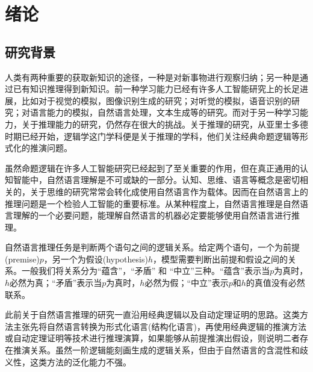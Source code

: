 \documentclass[UTF8,11pt,a4paper,nofonts]{ctexart}
\begin{document}
\newpage
\thispagestyle{empty}
\newpage
\tableofcontents
\thispagestyle{empty}

\newpage



\section{绪论}

\subsection{研究背景}
\par


人类有两种重要的获取新知识的途径，一种是对新事物进行观察归纳；另一种是通过已有知识推理得到新知识。前一种学习能力已经有许多人工智能研究上的长足进展，比如对于视觉的模拟，图像识别生成的研究\cite{}；对听觉的模拟，语音识别的研究\cite{}；对语言能力的模拟，自然语言处理，文本生成等的研究\cite{}。而对于另一种学习能力，关于推理能力的研究，仍然存在很大的挑战。关于推理的研究，从亚里士多德时期已经开始，逻辑学这门学科便是关于推理的学科，他们关注经典命题逻辑等形式化的推演问题。

虽然命题逻辑在许多人工智能研究已经起到了至关重要的作用，但在真正通用的认知智能中，自然语言理解是不可或缺的一部分。认知、思维、语言等概念是密切相关的，关于思维的研究常常会转化成使用自然语言作为载体。因而在自然语言上的推理问题是一个检验人工智能的重要标准。从某种程度上，自然语言推理是自然语言理解的一个必要问题，能理解自然语言的机器必定要能够使用自然语言进行推理。

自然语言推理任务是判断两个语句之间的逻辑关系。给定两个语句，一个为前提 (premise)$p$，另一个为假设(hypothesis)$h$，模型需要判断出前提和假设之间的关系。一般我们将关系分为“蕴含”，“矛盾” 和 “中立”三种。“蕴含”表示当$p$为真时，$h$必然为真；“矛盾”表示当$p$为真时，$h$必然为假；“中立”表示$p$和$h$的真值没有必然联系。





此前关于自然语言推理的研究一直沿用经典逻辑以及自动定理证明的思路。这类方法主张先将自然语言转换为形式化语言(结构化语言)，再使用经典逻辑的推演方法或自动定理证明等技术进行推理演算，如果能够从前提推演出假设，则说明二者存在推演关系。虽然一阶逻辑能刻画生成的逻辑关系，但由于自然语言的含混性和歧义性，这类方法的泛化能力不强。
\end{document}
